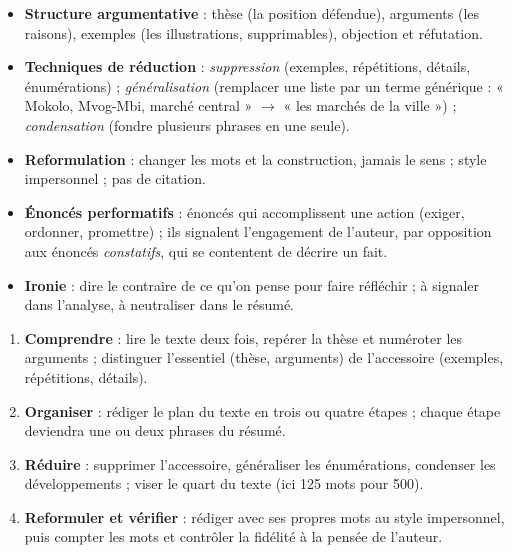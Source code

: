 \documentclass[11pt]{article}
\newcounter{popsec}
\newcounter{popsub}
\newcommand{\courssub}[1]{%
  \stepcounter{popsub}%
  \par\vspace{9pt}\noindent{\popxbold\fontsize{11.5}{13}\selectfont\color{popink}{\color{poporange}\thepopsec.\thepopsub}\hspace{6pt}#1}\par\nopagebreak\vspace{4pt}
}
\begin{document}
\courssub{Ressources à mobiliser}

\begin{aretenir}
\begin{itemize}
\item \textbf{Structure argumentative} : thèse (la position défendue), arguments (les raisons), exemples (les illustrations, supprimables), objection et réfutation.
\item \textbf{Techniques de réduction} : \emph{suppression} (exemples, répétitions, détails, énumérations) ; \emph{généralisation} (remplacer une liste par un terme générique : « Mokolo, Mvog-Mbi, marché central » $\rightarrow$ « les marchés de la ville ») ; \emph{condensation} (fondre plusieurs phrases en une seule).
\item \textbf{Reformulation} : changer les mots et la construction, jamais le sens ; style impersonnel ; pas de citation.
\item \textbf{Énoncés performatifs} : énoncés qui accomplissent une action (exiger, ordonner, promettre) ; ils signalent l'engagement de l'auteur, par opposition aux énoncés \emph{constatifs}, qui se contentent de décrire un fait.
\item \textbf{Ironie} : dire le contraire de ce qu'on pense pour faire réfléchir ; à signaler dans l'analyse, à neutraliser dans le résumé.
\end{itemize}
\end{aretenir}

\begin{methode}
\begin{enumerate}
\item \textbf{Comprendre} : lire le texte deux fois, repérer la thèse et numéroter les arguments ; distinguer l'essentiel (thèse, arguments) de l'accessoire (exemples, répétitions, détails).
\item \textbf{Organiser} : rédiger le plan du texte en trois ou quatre étapes ; chaque étape deviendra une ou deux phrases du résumé.
\item \textbf{Réduire} : supprimer l'accessoire, généraliser les énumérations, condenser les développements ; viser le quart du texte (ici 125 mots pour 500).
\item \textbf{Reformuler et vérifier} : rédiger avec ses propres mots au style impersonnel, puis compter les mots et contrôler la fidélité à la pensée de l'auteur.
\end{enumerate}
\end{methode}
\end{document}
